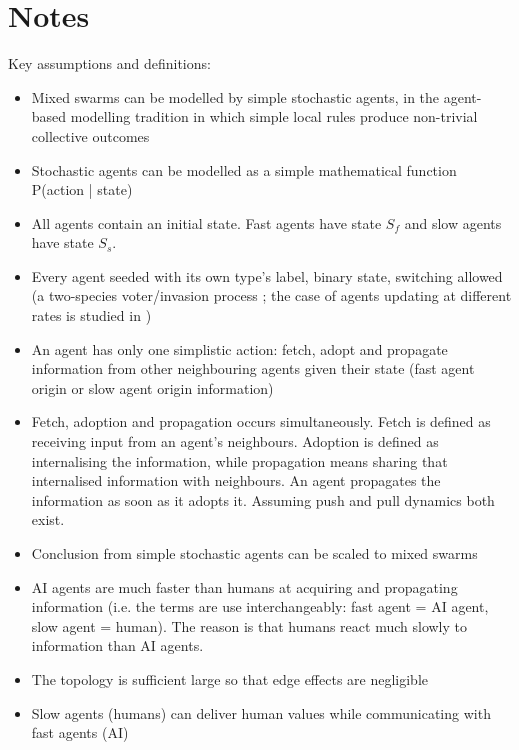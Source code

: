 \documentclass{article}
\begin{document}
\section{Notes}

Key assumptions and definitions:

\begin{itemize}
    \item Mixed swarms can be modelled by simple stochastic agents, in the agent-based modelling tradition in which simple local rules produce non-trivial collective outcomes \cite{schelling1971, epstein1996}
    \item Stochastic agents can be modelled as a simple mathematical function P(action | state)
    \item All agents contain an initial state. Fast agents have state $S_f$ and slow agents have state $S_s$.   
    \item Every agent seeded with its own type's label, binary state, switching allowed (a two-species voter/invasion process \cite{clifford1973, holley1975}; the case of agents updating at different rates is studied in \cite{sood2005, masuda2010})
    \item An agent has only one simplistic action: fetch, adopt and propagate information from other neighbouring agents given their state (fast agent origin or slow agent origin information) 
    \item Fetch, adoption and propagation occurs simultaneously. Fetch is defined as receiving input from an agent's neighbours. Adoption is defined as internalising the information, while propagation means sharing that internalised information with neighbours. An agent propagates the information as soon as it adopts it. Assuming push and pull dynamics both exist.
    \item Conclusion from simple stochastic agents can be scaled to mixed swarms
    \item AI agents are much faster than humans at acquiring and propagating information (i.e. the terms are use interchangeably: fast agent = AI agent, slow agent = human). The reason is that humans react much slowly to information than AI agents.
    \item The topology is sufficient large so that edge effects are negligible
    \item Slow agents (humans) can deliver human values while communicating with fast agents (AI)
    
\end{itemize}
\end{document}
